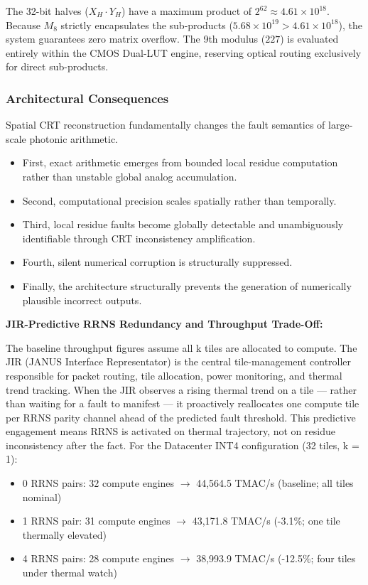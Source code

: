 \documentclass[journal]{IEEEtran}
\begin{document}
The 32-bit halves ($X_H \cdot Y_H$) have a maximum product of $2^{62} \approx 4.61 \times 10^{18}$. 
Because $M_8$ strictly encapsulates the sub-products ($5.68 \times 10^{19} > 4.61 \times 10^{18}$), the system guarantees zero matrix overflow. The 9th modulus ($227$) is evaluated entirely within the CMOS Dual-LUT engine, reserving optical routing exclusively for direct sub-products.
\subsubsection{\textbf{Architectural Consequences}}

Spatial CRT reconstruction fundamentally changes the fault semantics of large-scale photonic arithmetic.

\begin{itemize}
\item  First, exact arithmetic emerges from bounded local residue computation rather than unstable global analog accumulation.
\item  Second, computational precision scales spatially rather than temporally.
\item  Third, local residue faults become globally detectable and unambiguously identifiable through CRT inconsistency amplification.
\item  Fourth, silent numerical corruption is structurally suppressed.
\item  Finally, the architecture structurally prevents the generation of numerically plausible incorrect outputs.
\end{itemize}

\begin{center}
\textbf{JIR-Predictive RRNS Redundancy and Throughput Trade-Off: } 
\end{center}

The baseline throughput figures assume all k tiles are allocated to compute. The JIR (JANUS Interface Representator) is the central tile-management controller responsible for packet routing, tile allocation, power monitoring, and thermal trend tracking. When the JIR observes a rising thermal trend on a tile --- rather than waiting for a fault to manifest --- it proactively reallocates one compute tile per RRNS parity channel ahead of the predicted fault threshold. This predictive engagement means RRNS is activated on thermal trajectory, not on residue inconsistency after the fact. For the Datacenter INT4 configuration (32 tiles, k = 1):

\begin{itemize}
\item  0 RRNS pairs: 32 compute engines $\rightarrow$ 44,564.5 TMAC/s
(baseline; all tiles nominal)
\item  1 RRNS pair: 31 compute engines $\rightarrow$ 43,171.8 TMAC/s
(-3.1\%; one tile thermally elevated)
\item  4 RRNS pairs: 28 compute engines $\rightarrow$ 38,993.9 TMAC/s
(-12.5\%; four tiles under thermal watch)
\end{itemize}
\end{document}

